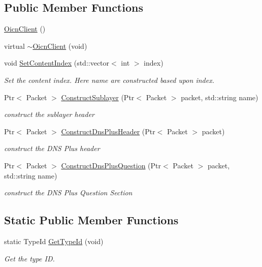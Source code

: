 \subsection*{Public Member Functions}
\begin{DoxyCompactItemize}
\item 
\hyperlink{classns3_1_1OicnClient_a4cd258edda3827dcc5d59acee6464e28}{Oicn\-Client} ()
\item 
virtual \hyperlink{classns3_1_1OicnClient_afd1c9b766b88ee402b679e772dfcee03}{$\sim$\-Oicn\-Client} (void)
\item 
void \hyperlink{classns3_1_1OicnClient_a6877bfdc4f2ded46fdd439fef46451b6}{Set\-Content\-Index} (std\-::vector$<$ int $>$ index)
\begin{DoxyCompactList}\small\item\em Set the content index. Here name are constructed based upon index. \end{DoxyCompactList}\item 
Ptr$<$ Packet $>$ \hyperlink{classns3_1_1OicnClient_aee54bdaf8223b42a87ce534dfa01c9a3}{Construct\-Sublayer} (Ptr$<$ Packet $>$ packet, std\-::string name)
\begin{DoxyCompactList}\small\item\em construct the sublayer header \end{DoxyCompactList}\item 
Ptr$<$ Packet $>$ \hyperlink{classns3_1_1OicnClient_a3f5f0ae8d72fd152ef7e3258f5df7589}{Construct\-Dns\-Plus\-Header} (Ptr$<$ Packet $>$ packet)
\begin{DoxyCompactList}\small\item\em construct the D\-N\-S Plus header \end{DoxyCompactList}\item 
Ptr$<$ Packet $>$ \hyperlink{classns3_1_1OicnClient_a38a118f1203789a1062367c1cf71a7b6}{Construct\-Dns\-Plus\-Question} (Ptr$<$ Packet $>$ packet, std\-::string name)
\begin{DoxyCompactList}\small\item\em construct the D\-N\-S Plus Question Section \end{DoxyCompactList}\end{DoxyCompactItemize}
\subsection*{Static Public Member Functions}
\begin{DoxyCompactItemize}
\item 
static Type\-Id \hyperlink{classns3_1_1OicnClient_abd0403cc141fa16ba8351f6d30bab33d}{Get\-Type\-Id} (void)
\begin{DoxyCompactList}\small\item\em Get the type I\-D. \end{DoxyCompactList}\end{DoxyCompactItemize}
